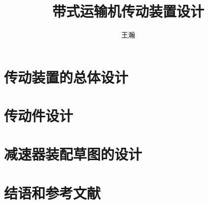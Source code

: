 \documentclass[12pt,a4paper,UTF8]{ctexart}
\author{王瀚}
\title{带式运输机传动装置设计}
\begin{document}
	
	\newpage
	\tableofcontents
	\newpage
	\section{传动装置的总体设计}
		
	\section{传动件设计}
		
	\section{减速器装配草图的设计}
		
		
		
		
	\section{结语和参考文献}
		
	\newpage
	
	
\end{document}
